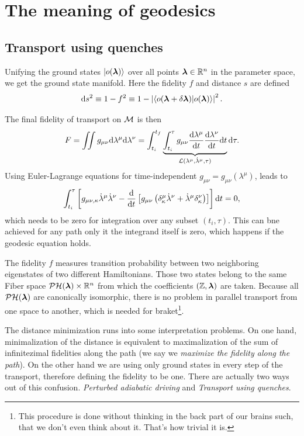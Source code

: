 \section{The meaning of geodesics}


\subsection{Transport using quenches}
\label{sec:quenches}
Unifying the ground states $\ket{o({\bm\lambda})}$ over all points ${\bm\lambda}\in\mathbb{R}^n$ in the parameter space, we get the ground state manifold. Here the fidelity $f$ and distance $s$ are defined
\begin{equation}
    \mathrm{d} s^2 \equiv 1-f^2\equiv 1-\left|\braket{o(\bm{{\bm\lambda}}+\delta\bm{{\bm\lambda}})|o(\bm{{\bm\lambda}})}\right|^2.
    \label{eq:distanceOnM0}
\end{equation}

The final fidelity of transport on $\mathcal{M}$ is then
\begin{equation}
    F=\iint g_{\mu\nu}\mathrm{d}\lambda^\mu\mathrm{d}\lambda^\nu = \int_{t_i}^{t_f}\underbrace{\int_{t_i}^\tau g_{\mu\nu}\frac{\mathrm{d} \lambda^\mu}{\mathrm{d} t}\frac{\mathrm{d} \lambda^\nu}{\mathrm{d} t} \mathrm{d} t}_{\mathcal{L}(\lambda^\mu,\dot\lambda^\mu,\tau)}\mathrm{d} \tau .
\end{equation}
Using Euler-Lagrange equations for time-independent $g_{\mu\nu}=g_{\mu\nu}(\lambda^\mu)$, leads to
\begin{equation}
    \int_{t_i}^{\tau}\left[g_{\mu\nu,\kappa}\dot\lambda^\mu\dot\lambda^\nu - \frac{\mathrm{d} }{\mathrm{d} t}\left[g_{\mu\nu}\left(\delta^\mu_\kappa\dot\lambda^\nu+\dot\lambda^\mu\delta^\nu_\kappa\right)\right]\right]\mathrm{d} t=0,
\end{equation}
which needs to be zero for integration over any subset $(t_i,\tau)$. This can bne achieved for any path only it the integrand itself is zero, which happens if the geodesic equation holds.

The fidelity $f$ measures transition probability between two neighboring eigenstates of two different Hamiltonians. Those two states belong to the same Fiber space $\mathcal{PH}({\bm\lambda})\times \mathbb{R}^n$ from which the coefficients $(\mathbb{Z},{\bm\lambda})$ are taken. Because all $\mathcal{PH}({\bm\lambda})$ are canonically isomorphic, there is no problem in parallel transport from one space to another, which is needed for braket\footnote{This procedure is done without thinking in the back part of our brains such, that we don't even think about it. That's how trivial it is.}.

The distance minimization runs into some interpretation problems. On one hand, minimalization of the distance is equivalent to maximalization of the sum of infinitezimal fidelities along the path (we say we \emph{maximize the fidelity along the path}). On the other hand we are using only ground states in every step of the transport, therefore defining the fidelity to be one. There are actually two ways out of this confusion. \emph{Perturbed adiabatic driving} and \emph{Transport using quenches}.


